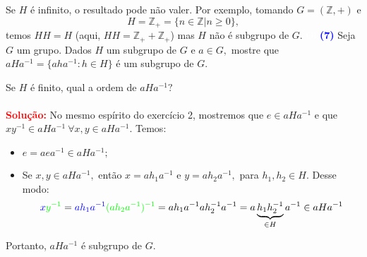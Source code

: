 \documentclass[12pt, a4paper]{article}
\begin{document}
Se $H$ é infinito, o resultado pode não valer. Por exemplo, tomando $G = (\mathbb{Z}, +)$ e 
\[
H = \mathbb{Z}_{+} = \{ n \in \mathbb{Z} | n \ge 0 \},
\]
temos $HH = H$ (aqui, $HH = \mathbb{Z}_{+} + \mathbb{Z}_{+}$) mas $H$ não é subgrupo de $G.$
\textcolor{white}{Oi}\newline\newline
\textcolor{blue}{\bf(7)}\label{15} Seja $G$ um grupo. Dados $H$ um subgrupo de $G$ e $a \in G,$ mostre que $aHa^{-1} = \{aha^{ -1} : h \in H \}$ é um subgrupo de $G.$

Se $H$ é finito, qual a ordem de $aHa^{-1}?$\\ \\
\textbf{\textcolor{red}{Solução:}} No mesmo espírito do exercício 2, mostremos que $e \in aHa^{-1}$ e que $xy^{-1} \in aHa^{-1} \ \forall x,y \in aHa^{-1}.$ Temos:
\begin{itemize}
    \item $e = aea^{-1} \in aHa^{-1};$
    \item Se $x,y \in aHa^{-1},$ então $x = ah_1a^{-1}$ e $y = ah_2a^{-1},$ para $h_1, h_2 \in H.$ Desse modo:
    \[
    \textcolor{blue}{x}\textcolor{green}{y^{-1}} =     \textcolor{blue}{ah_1a^{-1}}\textcolor{green}{(ah_2a^{-1})^{-1}} = ah_1a^{-1} ah_2^{-1}a^{-1} = a\underbrace{h_1h_2^{-1}}_{\in H} a^{-1} \in aHa^{-1} 
    \]
\end{itemize}
Portanto, $aHa^{-1}$ é subgrupo de $G.$
\end{document}
